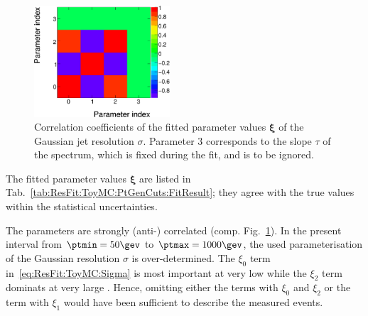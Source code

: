 \begin{figure}[ht]
  \centering
  \includegraphics[width=0.45\textwidth]{figures/resFit_ToyMC_PtGenCuts_Correlations}
  \caption{Correlation coefficients of the fitted parameter values
    $\mathbf{\xi}$ of the Gaussian jet \pt resolution $\sigma$. 
    Parameter $3$ corresponds to the slope $\tau$ of the
    spectrum, which is fixed during the fit, and is to be ignored.}
  \label{fig:ResFit:ToyMC:PtGenCuts:ParCorr}
\end{figure}

The fitted parameter values $\mathbf{\xi}$ are listed in Tab.~\ref{tab:ResFit:ToyMC:PtGenCuts:FitResult};
they agree with the true values within the statistical uncertainties.

The parameters are strongly (anti-) correlated (comp. Fig.~\ref{fig:ResFit:ToyMC:PtGenCuts:ParCorr}).
In the present \pttrue interval from \mbox{$\ptmin = 50\gev$} to \mbox{$\ptmax = 1000\gev$}, the used parameterisation of the Gaussian resolution $\sigma$ is over-determined.
The $\xi_{0}$ term in~\eqref{eq:ResFit:ToyMC:Sigma} is most important at very low \pt while the $\xi_{2}$ term dominats at very large \pt.
Hence, omitting either the terms with $\xi_{0}$ and $\xi_{2}$ or the
term with $\xi_{1}$ would have been sufficient to describe the measured events.

